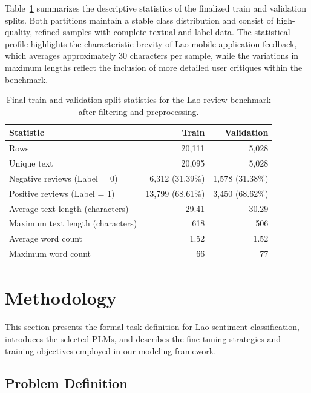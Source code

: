\documentclass[conference, onecolumn]{IEEEtran}
\begin{document}
Table~\ref{tab:train_val_stats} summarizes the descriptive statistics of the finalized train and validation splits. Both partitions maintain a stable class distribution and consist of high-quality, refined samples with complete textual and label data. The statistical profile highlights the characteristic brevity of Lao mobile application feedback, which averages approximately 30 characters per sample, while the variations in maximum lengths reflect the inclusion of more detailed user critiques within the benchmark.
\begin{table}[H]
\centering
\caption{Final train and validation split statistics for the Lao review benchmark after filtering and preprocessing.}
\small
\setlength{\tabcolsep}{10pt}
\renewcommand{\arraystretch}{1.12}
\begin{tabular}{@{}p{}rr@{}}
\toprule
\textbf{Statistic} & \textbf{Train} & \textbf{Validation} \\
\midrule
Rows & 20,111 & 5,028 \\
Unique text & 20,095 & 5,028 \\
\addlinespace[0.2em]
Negative reviews (Label = 0) & 6,312 (31.39\%) & 1,578 (31.38\%) \\
Positive reviews (Label = 1) & 13,799 (68.61\%) & 3,450 (68.62\%) \\
\addlinespace[0.2em]
Average text length (characters) & 29.41 & 30.29 \\
Maximum text length (characters) & 618 & 506 \\
\addlinespace[0.2em]
Average word count & 1.52 & 1.52 \\
Maximum word count & 66 & 77 \\
\bottomrule
\end{tabular}
\label{tab:train_val_stats}
\end{table}
 

\section{Methodology}
\label{sec:methodology}

This section presents the formal task definition for Lao sentiment classification, introduces the selected PLMs, and describes the fine-tuning strategies and training objectives employed in our modeling framework.

\subsection{Problem Definition}
\label{sec:problem_definition}
\label{subsec:methodology_task}
\end{document}
